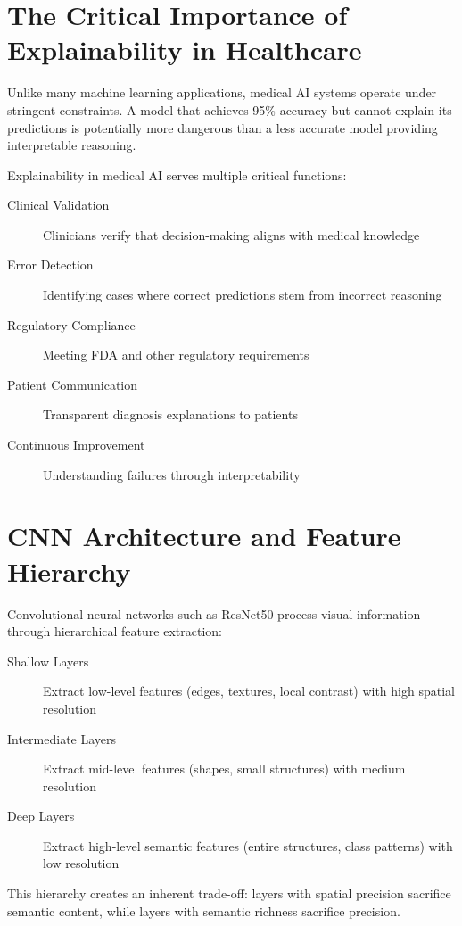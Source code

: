 \documentclass[12pt,a4paper,oneside]{book}
\begin{document}
\section{The Critical Importance of Explainability in Healthcare}

Unlike many machine learning applications, medical AI systems operate under stringent constraints. A model that achieves 95\% accuracy but cannot explain its predictions is potentially more dangerous than a less accurate model providing interpretable reasoning.

Explainability in medical AI serves multiple critical functions:

\begin{description}
  \item[Clinical Validation] Clinicians verify that decision-making aligns with medical knowledge
  \item[Error Detection] Identifying cases where correct predictions stem from incorrect reasoning
  \item[Regulatory Compliance] Meeting FDA and other regulatory requirements
  \item[Patient Communication] Transparent diagnosis explanations to patients
  \item[Continuous Improvement] Understanding failures through interpretability
\end{description}

\section{CNN Architecture and Feature Hierarchy}

Convolutional neural networks such as ResNet50 process visual information through hierarchical feature extraction:

\begin{description}
  \item[Shallow Layers] Extract low-level features (edges, textures, local contrast) with high spatial resolution
  \item[Intermediate Layers] Extract mid-level features (shapes, small structures) with medium resolution
  \item[Deep Layers] Extract high-level semantic features (entire structures, class patterns) with low resolution
\end{description}

This hierarchy creates an inherent trade-off: layers with spatial precision sacrifice semantic content, while layers with semantic richness sacrifice precision.
\end{document}

